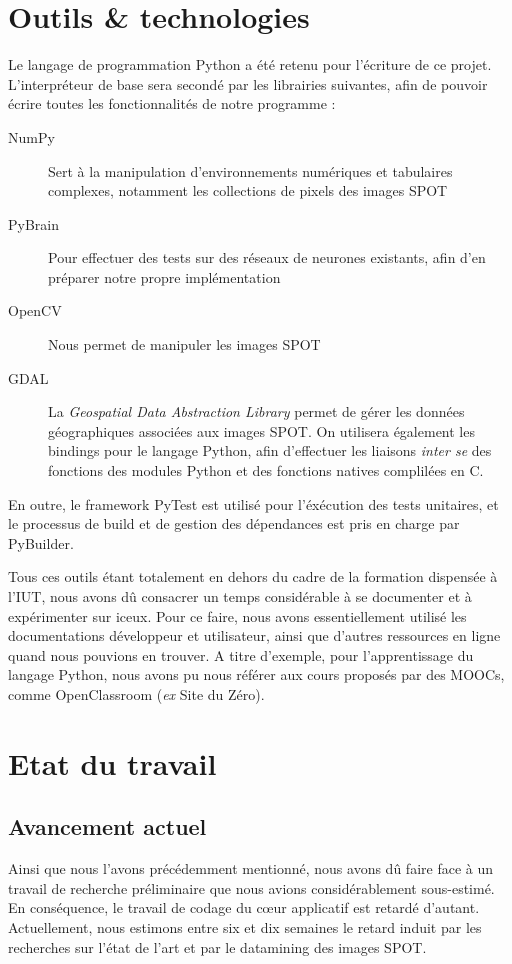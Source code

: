 \documentclass[a4paper, 12pt]{article}
\begin{document}
\section{Outils \& technologies}
Le langage de programmation Python a été retenu pour l'écriture de ce projet. L'interpréteur de base sera secondé par les librairies suivantes, afin de pouvoir écrire toutes les fonctionnalités de notre programme :
\begin{description}
	\item[NumPy] Sert à la manipulation d’environnements numériques et tabulaires complexes, notamment les collections de pixels des images SPOT
	\item[PyBrain] Pour effectuer des tests sur des réseaux de neurones existants, afin d'en préparer notre propre implémentation
	\item[OpenCV] Nous permet de manipuler les images SPOT
	\item[GDAL] La \emph{Geospatial Data Abstraction Library} permet de gérer les données géographiques associées aux images SPOT. On utilisera également les bindings pour le langage Python, afin d'effectuer les liaisons \textit{inter se} des fonctions des modules Python et des fonctions natives complilées en C.
\end{description}

En outre, le framework PyTest est utilisé pour l'éxécution des tests unitaires, et le processus de build et de gestion des dépendances est pris en charge par PyBuilder.

Tous ces outils étant totalement en dehors du cadre de la formation dispensée à l'IUT, nous avons dû consacrer un temps considérable à se documenter et à expérimenter sur iceux. Pour ce faire, nous avons essentiellement utilisé les documentations développeur et utilisateur, ainsi que d'autres ressources en ligne quand nous pouvions en trouver. A titre d'exemple, pour l'apprentissage du langage Python, nous avons pu nous référer aux cours proposés par des MOOCs, comme OpenClassroom (\textit{ex} Site du Zéro).

\section{Etat du travail}
\subsection{Avancement actuel}
Ainsi que nous l'avons précédemment mentionné, nous avons dû faire face à un travail de recherche préliminaire que nous avions considérablement sous-estimé. En conséquence, le travail de codage du cœur applicatif est retardé d'autant. Actuellement, nous estimons entre six et dix semaines le retard induit par les recherches sur l'état de l'art et par le datamining des images SPOT.
\end{document}
